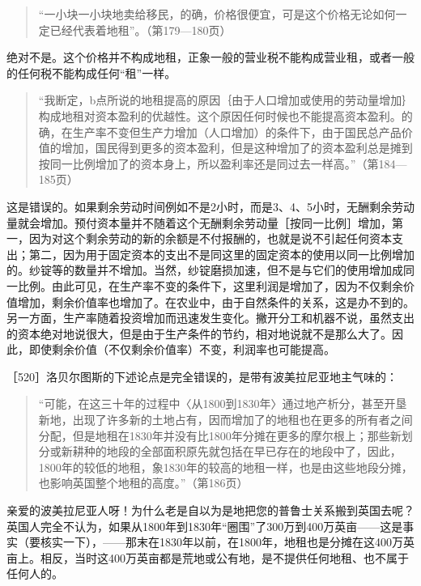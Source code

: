 \begin{quote}{“一小块一小块地卖给移民，的确，价格很便宜，可是这个价格无论如何一定已经代表着地租”。（第179—180页）}\end{quote}

绝对不是。这个价格并不构成地租，正象一般的营业税不能构成营业租，或者一般的任何税不能构成任何“租”一样。

\begin{quote}{“我断定，b点所说的地租提高的原因｛由于人口增加或使用的劳动量增加｝构成地租对资本盈利的优越性。这个原因任何时候也不能提高资本盈利。的确，在生产率不变但生产力增加（人口增加）的条件下，由于国民总产品价值的增加，国民得到更多的资本盈利，但是这种增加了的资本盈利总是摊到按同一比例增加了的资本身上，所以盈利率还是同过去一样高。”（第184—185页）}\end{quote}

这是错误的。如果剩余劳动时间例如不是2小时，而是3、4、5小时，无酬剩余劳动量就会增加。预付资本量并不随着这个无酬剩余劳动量［按同一比例］增加，第一，因为对这个剩余劳动的新的余额是不付报酬的，也就是说不引起任何资本支出；第二，因为用于固定资本的支出不是同这里的固定资本的使用以同一比例增加的。纱锭等的数量并不增加。当然，纱锭磨损加速，但不是与它们的使用增加成同一比例。由此可见，在生产率不变的条件下，这里利润是增加了，因为不仅剩余价值增加，剩余价值率也增加了。在农业中，由于自然条件的关系，这是办不到的。另一方面，生产率随着投资增加而迅速发生变化。撇开分工和机器不说，虽然支出的资本绝对地说很大，但是由于生产条件的节约，相对地说就不是那么大了。因此，即使剩余价值（不仅剩余价值率）不变，利润率也可能提高。

［520］洛贝尔图斯的下述论点是完全错误的，是带有波美拉尼亚地主气味的：

\begin{quote}{“可能，在这三十年的过程中〈从1800到1830年〉通过地产析分，甚至开垦新地，出现了许多新的土地占有，因而增加了的地租也在更多的所有者之间分配，但是地租在1830年并没有比1800年分摊在更多的摩尔根上；那些新划分或新耕种的地段的全部面积原先就包括在早已存在的地段中了，因此，1800年的较低的地租，象1830年的较高的地租一样，也是由这些地段分摊，也影响英国整个地租的高度。”（第186页）}\end{quote}

亲爱的波美拉尼亚人呀！为什么老是自以为是地把您的普鲁士关系搬到英国去呢？英国人完全不认为，如果从1800年到1830年“圈围”了300万到400万英亩——这是事实（要核实一下），——那末在1830年以前，在1800年，地租也是分摊在这400万英亩上。相反，当时这400万英亩都是荒地或公有地，是不提供任何地租、也不属于任何人的。


